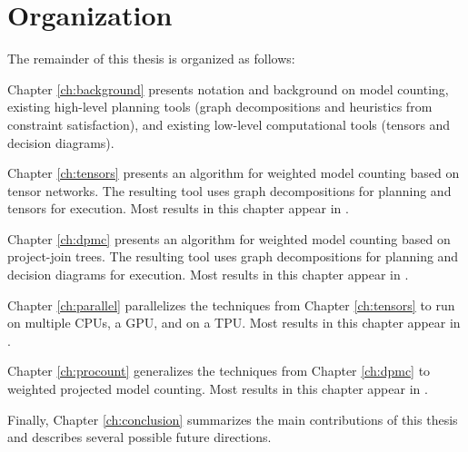 \section{Organization}
The remainder of this thesis is organized as follows:

Chapter \ref{ch:background} presents notation and background on model counting, existing high-level planning tools (graph decompositions and heuristics from constraint satisfaction), and existing low-level computational tools (tensors and decision diagrams). 

Chapter \ref{ch:tensors} presents an algorithm for weighted model counting based on tensor networks. The resulting tool  uses graph decompositions for planning and tensors for execution. Most results in this chapter appear in \cite{DDV19}.

Chapter \ref{ch:dpmc} presents an algorithm for weighted model counting based on project-join trees. The resulting tool  uses graph decompositions for planning and decision diagrams for execution. Most results in this chapter appear in \cite{dudek2020dpmc}.

Chapter \ref{ch:parallel} parallelizes the techniques from Chapter \ref{ch:tensors} to run on multiple CPUs, a GPU, and on a TPU. Most results in this chapter appear in \cite{dudek2020parallel}.

Chapter \ref{ch:procount} generalizes the techniques from Chapter \ref{ch:dpmc} to weighted projected model counting. Most results in this chapter appear in \cite{dudek2020procount}.

Finally, Chapter \ref{ch:conclusion} summarizes the main contributions of this thesis and describes several possible future directions.